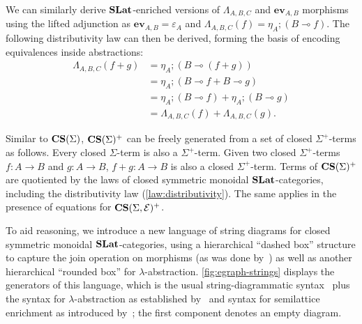 We can similarly derive $\mathbf{SLat}$-enriched versions of  $\Lambda_{A,B,C}$ and $\textbf{ev}_{A,B}$ morphisms using the lifted adjunction as $\textbf{ev}_{A,B} = \varepsilon_{A}$ and $\Lambda_{A,B,C}(f) = \eta_A; (B \multimap{} f)$.
The following distributivity law can then be derived, forming the basis of encoding equivalences inside abstractions:
\begin{equation}
	\begin{aligned}
		\Lambda_{A,B,C}(f + g) & = \eta_A;(B \multimap (f + g))                    \\
		                       & = \eta_A;(B \multimap f + B \multimap g)          \\
		                       & = \eta_A;(B \multimap f) + \eta_A;(B \multimap g) \\
		                       & = \Lambda_{A,B,C}(f) + \Lambda_{A,B,C}(g).
	\end{aligned}%
	\label{law:distributivity}
\end{equation}

Similar to $\mathbf{CS}(\Sigma)$, $\mathbf{CS}(\Sigma)^{+}$ can be freely generated from a set of closed $\Sigma^{+}$-terms as follows.
Every closed $\Sigma$-term is also a $\Sigma^{+}$-term.
Given two closed $\Sigma^{+}$-terms $f\colon A \to B$ and $g\colon A \to B$, $f + g\colon A \to B$ is also a closed $\Sigma^{+}$-term.
Terms of $\mathbf{CS}(\Sigma)^{+}$ are quotiented by the laws of closed symmetric monoidal $\mathbf{SLat}$-categories, including the distributivity law (\autoref{law:distributivity}).
The same applies in the presence of equations for $\mathbf{CS}(\Sigma,\mathcal{E})^{+}$.

To aid reasoning, we introduce a new language of string diagrams for closed symmetric monoidal $\mathbf{SLat}$-categories, using a hierarchical \enquote{dashed box} structure to capture the join operation on morphisms (as was done by~\citet{tiurin2025equivalencehypergraphsdporewriting}) as well as another hierarchical \enquote{rounded box} for $\lambda$-abstraction.
\autoref{fig:egraph-strings} displays the generators of this language, which is the usual string-diagrammatic syntax~\cite{Selinger_2010} plus the syntax for $\lambda$-abstraction as established by~\citet{ghica2024stringdiagramslambdacalculifunctional} and syntax for semilattice enrichment as introduced by~\citet{tiurin2025equivalencehypergraphsdporewriting}; the first component denotes an empty diagram.


